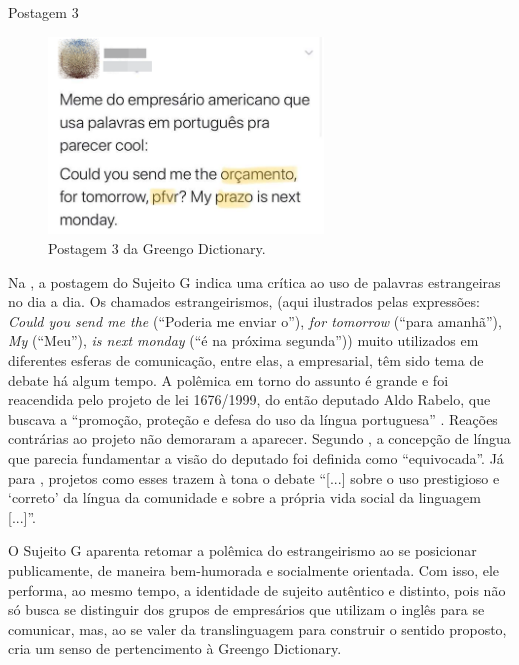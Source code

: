 \documentclass[portuguese]{textolivre}
\begin{document}
Postagem 3

\begin{figure}[htbp]
 \centering
 \includegraphics[width=0.65\textwidth]{Fig5.png}
 \caption{Postagem 3 da Greengo Dictionary.}
 \label{fig5}
\end{figure}

Na , a postagem do Sujeito G indica uma crítica ao uso de palavras estrangeiras no dia a dia. Os chamados estrangeirismos, (aqui ilustrados pelas expressões: \textit{Could you send me the} (“Poderia me enviar o”), \textit{for tomorrow} (“para amanhã”), \textit{My} (“Meu”), \textit{is next monday} (“é na próxima segunda”)) muito utilizados em diferentes esferas de comunicação, entre elas, a empresarial, têm sido tema de debate há algum tempo. A polêmica em torno do assunto é grande e foi reacendida pelo projeto de lei 1676/1999, do então deputado Aldo Rabelo, que buscava a “promoção, proteção e defesa do uso da língua portuguesa” \cite{faraco_estrangeirismos:_2011}. Reações contrárias ao projeto não demoraram a aparecer. Segundo \textcite{faraco_estrangeirismos:_2011}, a concepção de língua que parecia fundamentar a visão do deputado foi definida como “equivocada”. Já para \textcite[p. 15]{garcez_estrangeirismos:_2001}, projetos como esses trazem à tona o debate “[...] sobre o uso prestigioso e ‘correto’ da língua da comunidade e sobre a própria vida social da linguagem [...]”.

O Sujeito G aparenta retomar a polêmica do estrangeirismo ao se posicionar publicamente, de maneira bem-humorada e socialmente orientada. Com isso, ele performa, ao mesmo tempo, a identidade de sujeito autêntico e distinto, pois não só busca se distinguir dos grupos de empresários que utilizam o inglês para se comunicar, mas, ao se valer da translinguagem para construir o sentido proposto, cria um senso de pertencimento à Greengo Dictionary.			
\end{document}
